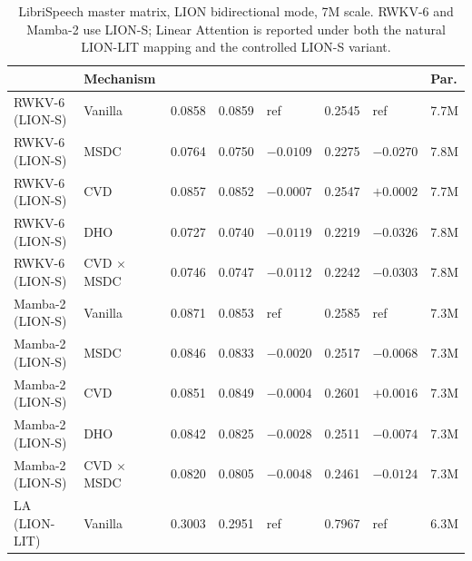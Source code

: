 \begin{table}[p]
\centering
\small
\caption[LibriSpeech master matrix, LION 7M]{LibriSpeech
master matrix, LION bidirectional mode, 7M scale. RWKV-6 and
Mamba-2 use LION-S; Linear Attention is reported under both the
natural LION-LIT mapping and the controlled LION-S variant.}
\label{tab:results:master-matrix-lion-7m}
\setlength{\tabcolsep}{2pt}
\renewcommand{\arraystretch}{1.15}
\begin{tabularx}{\linewidth}{@{}L{2.60cm} L{2.48cm} N{1.32cm} N{1.32cm} N{1.60cm} N{1.40cm} N{1.60cm} N{0.86cm}@{}}
\toprule
\textbf{} & \textbf{Mechanism} &
\textbf{} & \textbf{} & \textbf{\shortstack[r]{$\Delta$\\CER}} &
\textbf{} & \textbf{\shortstack[r]{$\Delta$\\WER}} & \textbf{Par.} \\
\midrule
RWKV-6 (LION-S)    & Vanilla         & 0.0858 & 0.0859 & ref       & 0.2545 & ref       & 7.7M \\
RWKV-6 (LION-S)    & MSDC            & 0.0764 & 0.0750 & $-0.0109$ & 0.2275 & $-0.0270$ & 7.8M \\
RWKV-6 (LION-S)    & CVD             & 0.0857 & 0.0852 & $-0.0007$ & 0.2547 & $+0.0002$ & 7.7M \\
RWKV-6 (LION-S)    & DHO             & 0.0727 & 0.0740 & $-0.0119$ & 0.2219 & $-0.0326$ & 7.8M \\
RWKV-6 (LION-S)    & CVD $\times$ MSDC & 0.0746 & 0.0747 & $-0.0112$ & 0.2242 & $-0.0303$ & 7.8M \\
\addlinespace
Mamba-2 (LION-S)   & Vanilla         & 0.0871 & 0.0853 & ref       & 0.2585 & ref       & 7.3M \\
Mamba-2 (LION-S)   & MSDC            & 0.0846 & 0.0833 & $-0.0020$ & 0.2517 & $-0.0068$ & 7.3M \\
Mamba-2 (LION-S)   & CVD             & 0.0851 & 0.0849 & $-0.0004$ & 0.2601 & $+0.0016$ & 7.3M \\
Mamba-2 (LION-S)   & DHO             & 0.0842 & 0.0825 & $-0.0028$ & 0.2511 & $-0.0074$ & 7.3M \\
Mamba-2 (LION-S)   & CVD $\times$ MSDC & 0.0820 & 0.0805 & $-0.0048$ & 0.2461 & $-0.0124$ & 7.3M \\
\addlinespace
LA (LION-LIT)      & Vanilla         & 0.3003 & 0.2951 & ref       & 0.7967 & ref       & 6.3M \\

\end{tabularx}
\end{table}
